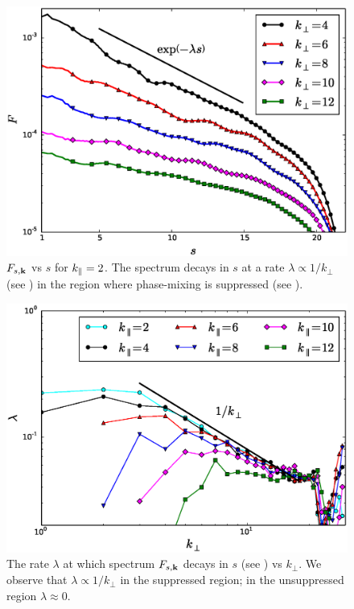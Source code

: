     \begin{figure}
    \begin{center}
        \includegraphics[width=14.8cm]{figs/phmixnl/M900_kz2_vss.eps}
        \caption{$F_{s,\mathbf{k}}$ vs $s$ for $k_\parallel=2$. The spectrum decays in $s$ at a rate $\lambda \propto
        1/k_\perp$ (see ) in the region where phase-mixing is
        suppressed (see
        ).}
        \label{phmixnl:fig:m100f:kz2:vss}
    \end{center}
    \end{figure}
    \begin{figure}
    \begin{center}
        \includegraphics[width=14.8cm]{figs/phmixnl/M900_lambda_vskp.eps}
        \caption{The rate $\lambda$ at which spectrum $F_{s,\mathbf{k}}$ decays in $s$ (see
        ) vs $k_\perp$. We observe that $\lambda \propto
        1/k_\perp$ in the suppressed region; in the unsuppressed region $\lambda \approx
        0$.}
        \label{phmixnl:fig:lambda:vskp}
    \end{center}
    \end{figure}
